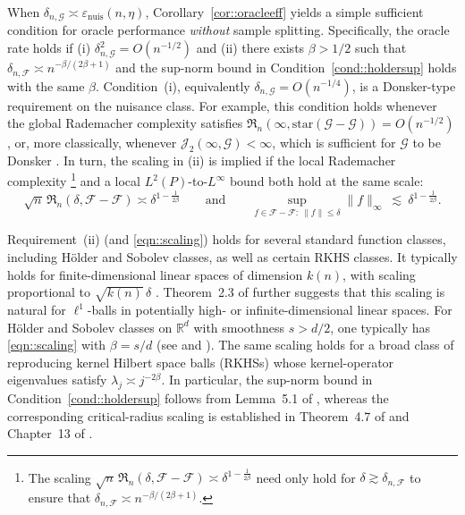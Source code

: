 \documentclass[11pt]{article}
\theoremstyle{plain}
\theoremstyle{definition} %
\begin{document}
When \(\delta_{n,\mathcal G} \asymp \varepsilon_{\mathrm{nuis}}(n,\eta)\),
Corollary~\ref{cor::oracleeff} yields a simple sufficient condition for oracle
performance \emph{without} sample splitting. Specifically, the oracle rate
holds if (i) \(\delta_{n,\mathcal G}^2 = O(n^{-1/2})\) and (ii) there exists
\(\beta>1/2\) such that \(\delta_{n,\mathcal F}\asymp
n^{-\beta/(2\beta+1)}\) and the sup-norm bound in
Condition~\ref{cond::holdersup} holds with the same \(\beta\). Condition~(i),
equivalently \(\delta_{n,\mathcal G}=O(n^{-1/4})\), is a Donsker-type
requirement on the nuisance class. For example, this condition holds whenever the global Rademacher complexity
satisfies
\(\mathfrak{R}_n(\infty,\mathrm{star}(\mathcal G-\mathcal G))=O(n^{-1/2})\),
or, more classically, whenever \(\mathcal J_2(\infty,\mathcal G)<\infty\),
which is sufficient for \(\mathcal G\) to be Donsker
\citep{van1996weak}. In
turn, the scaling in (ii) is implied if the local Rademacher complexity%
\footnote{The scaling
\(\sqrt{n}\,\mathfrak{R}_n(\delta,\mathcal F-\mathcal F)\asymp
\delta^{1-\tfrac{1}{2\beta}}\) need only hold for
\(\delta \gtrsim \delta_{n,\mathcal F}\) to ensure that
\(\delta_{n,\mathcal F}\asymp n^{-\beta/(2\beta+1)}\).}
and a local \(L^2(P)\)-to-\(L^\infty\) bound both hold at the same scale:
\begin{equation}
\sqrt{n}\,\mathfrak{R}_n(\delta,\mathcal F-\mathcal F)\asymp \delta^{1-\tfrac{1}{2\beta}}
\qquad\text{and}\qquad
\sup_{f \in \mathcal{F}-\mathcal{F}:\ \|f\|\le \delta}\|f\|_{\infty}\ \lesssim\ \delta^{1-\tfrac{1}{2\beta}}.
\label{eqn::scaling}
\end{equation}
 
 

 

 

Requirement~(ii) (and \eqref{eqn::scaling}) holds for several standard function classes, including H\"older and Sobolev classes, as well as certain RKHS classes. It typically holds for finite-dimensional linear spaces of dimension \(k(n)\), with scaling proportional to \(\sqrt{k(n)}\,\delta\) \citep{van2014uniform}. Theorem~2.3 of \cite{van2014uniform} further suggests that this scaling is natural for \(\ell^1\)-balls in potentially high- or infinite-dimensional linear spaces. For H\"older and Sobolev classes on \(\mathbb{R}^d\) with smoothness \(s>d/2\), one typically has \eqref{eqn::scaling} with \(\beta=s/d\) (see \citealt[Lemma~4]{bibaut2021sequential} and \citealt{adams2003sobolev,triebel2006theory}). The same scaling holds for a broad class of reproducing kernel Hilbert space balls (RKHSs) whose kernel-operator eigenvalues satisfy \(\lambda_j \asymp j^{-2\beta}\). In particular, the sup-norm bound in Condition~\ref{cond::holdersup} follows from Lemma~5.1 of \citet{mendelson2010regularization}, whereas the corresponding critical-radius scaling is established in Theorem~4.7 of \citet{mendelson2010regularization} and Chapter~13 of \citet{wainwright2019high}.
\end{document}
